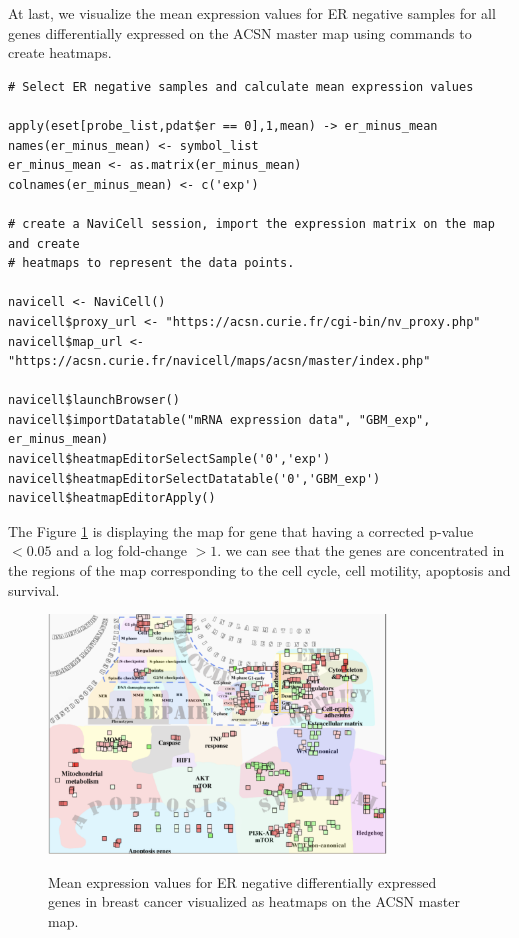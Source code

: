 \documentclass[article]{jss}
\begin{document}
At last, we visualize the mean expression values for ER negative samples for all
genes differentially expressed on the ACSN master map using 
commands to create heatmaps.

\begin{verbatim}
# Select ER negative samples and calculate mean expression values

apply(eset[probe_list,pdat$er == 0],1,mean) -> er_minus_mean
names(er_minus_mean) <- symbol_list
er_minus_mean <- as.matrix(er_minus_mean)
colnames(er_minus_mean) <- c('exp')

# create a NaviCell session, import the expression matrix on the map and create
# heatmaps to represent the data points.

navicell <- NaviCell()
navicell$proxy_url <- "https://acsn.curie.fr/cgi-bin/nv_proxy.php"
navicell$map_url <- "https://acsn.curie.fr/navicell/maps/acsn/master/index.php"

navicell$launchBrowser()
navicell$importDatatable("mRNA expression data", "GBM_exp", er_minus_mean)
navicell$heatmapEditorSelectSample('0','exp')
navicell$heatmapEditorSelectDatatable('0','GBM_exp')
navicell$heatmapEditorApply()
\end{verbatim}

The Figure \ref{fig:mainz} is displaying the map for gene that having a
corrected p-value $< 0.05$ and a log fold-change $>1$. we can see that the genes
are concentrated in the regions of the map corresponding to the cell cycle, cell
motility, apoptosis and survival.

\begin{figure}[!ht]
  \caption{Mean expression values for ER negative differentially expressed
  genes in breast cancer visualized as heatmaps on the ACSN master map.} 
  \centering
  \includegraphics[width=0.8\textwidth]{figures/mainz_acsn.pdf}
  \label{fig:mainz}
\end{figure}
\end{document}
